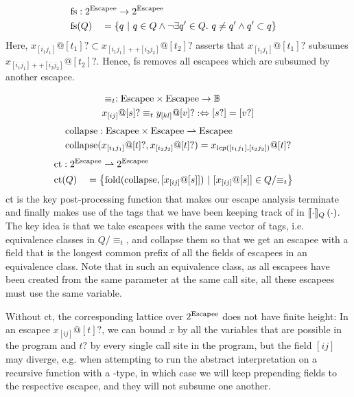 \begin{alignat*}{3}
	\fs &: \mathrlap{2^{\Escapee} \to 2^{\Escapee}} \\
	\fs&(Q) &&= \left\{q \ |\ q \in Q \land \lnot \exists q' \in Q.\ q \neq q' \land q' \subset q\right\}
\end{alignat*}
Here, $x_{[i_1j_1]} @ [t_1]? \subset x_{[i_1j_1]++[i_2j_2]} @ [t_2]?$ asserts that $x_{[i_1j_1]} @ [t_1]?$ subsumes $x_{[i_1j_1]++[i_2j_2]} @ [t_2]?$. Hence, fs removes all escapees which are subsumed by another escapee.

\begin{alignat*}{1}
	&\equiv_t : \mathrm{Escapee} \times \mathrm{Escapee} \to \mathbb{B} \\
	&x_{[ij]} @ [s]? \equiv_t y_{[kl]} @ [v]? :\Leftrightarrow [s?] = [v?]
\end{alignat*}
\begin{align*}
	\mathrm{collapse} &: \mathrm{Escapee} \times \mathrm{Escapee} \rightharpoonup \mathrm{Escapee} \\
	\mathrm{collapse}&(x_{[i_1j_1]} @ [t]?, x_{[i_2j_2]} @ [t]?) = x_{lcp([i_1j_1], [i_2j_2])} @ [t]?
\end{align*}
\begin{alignat*}{3}
	\ct &: \mathrlap{2^{\Escapee} \rightharpoonup 2^{\Escapee}} \\
	\ct&(Q) &&= \left\{\mathrm{fold}(\collapse, [x_{[ij]} @ [s]])\ |\ [x_{[ij]} @ [s]] \in Q/{\equiv_t} \right\}
\end{alignat*}
ct is the key post-processing function that makes our escape analysis terminate and finally makes use of the tags that we have been keeping track of in $\llbracket {\cdot} \rrbracket_Q \left( {\cdot} \right)$. The key idea is that we take escapees with the same vector of tags, i.e. equivalence classes in $Q/{\equiv_t}$, and collapse them so that we get an escapee with a field that is the longest common prefix of all the fields of escapees in an equivalence class. Note that in such an equivalence class, as all escapees have been created from the same parameter at the same call site, all these escapees must use the same variable.

Without ct, the corresponding lattice over $2^{\mathrm{Escapee}}$ does not have finite height: In an escapee $x_{[ij]} @ [t]?$, we can bound $x$ by all the variables that are possible in the program and $t?$ by every single call site in the program, but the field $[ij]$ may diverge, e.g. when attempting to run the abstract interpretation on a recursive function with a -type, in which case we will keep prepending fields to the respective escapee, and they will not subsume one another. 

